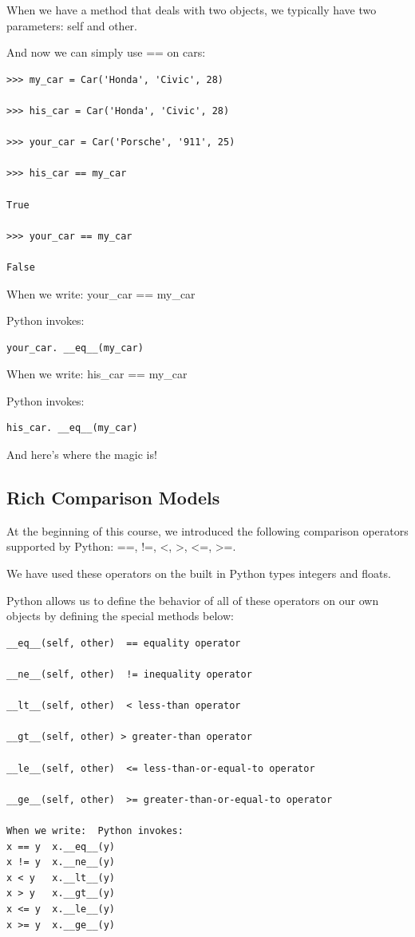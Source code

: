 \documentclass{article}
\begin{document}
When we have a method that deals with two objects, we typically have two parameters: self and other.

And now we can simply use == on cars:

\begin{lstlisting}
>>> my_car = Car('Honda', 'Civic', 28)

>>> his_car = Car('Honda', 'Civic', 28)

>>> your_car = Car('Porsche', '911', 25)

>>> his_car == my_car

True

>>> your_car == my_car

False
\end{lstlisting}

When we write:  your{\_}car == my{\_}car

Python invokes:

\begin{lstlisting}
your_car. __eq__(my_car)
\end{lstlisting}

When we write:  his{\_}car == my{\_}car

Python invokes:
\begin{lstlisting}
his_car. __eq__(my_car)
\end{lstlisting}

And here's where the magic is!

\subsection{Rich Comparison Models}

At the beginning of this  course, we introduced the following comparison operators supported by Python:  ==, !=, <, >, <=, >=.

We have used these operators on the built in Python types integers and floats.  

Python allows us to define the behavior of all of these operators on our own objects by defining the special methods below:

\begin{lstlisting}
__eq__(self, other)  == equality operator  

__ne__(self, other)  != inequality operator 

__lt__(self, other)  < less-than operator

__gt__(self, other) > greater-than operator

__le__(self, other)  <= less-than-or-equal-to operator

__ge__(self, other)  >= greater-than-or-equal-to operator

When we write:	Python invokes:
x == y	x.__eq__(y)
x != y	x.__ne__(y)
x < y	x.__lt__(y)
x > y	x.__gt__(y)
x <= y	x.__le__(y)
x >= y	x.__ge__(y)
\end{lstlisting}
\end{document}
